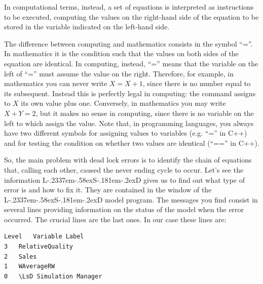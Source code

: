 \documentclass [11pt,a4paper] {book}
\def\LsD{{L\kern-.2337em\lower-.58ex\hbox{S}\kern-.181em\lower-.2ex\hbox{D}}\xspace}
\begin{document}
In computational terms, instead, a set of equations is interpreted as instructions to be executed, computing the values on the right-hand side of the equation to be stored in the variable indicated on the left-hand side.

The difference between computing and
mathematics consists in the symbol ``=''. In mathematics it is the condition such that
the values on both sides of the equation are identical. In computing, instead, ``=''
means that the variable on the left of ``='' must assume the value on the right.
Therefore, for example, in mathematics you can never write $X=X+1$, since there is no
number equal to its subsequent. Instead this is perfectly legal in computing: the
command assigns to $X$ its own value plus one. Conversely, in mathematics you may write
$X+Y=2$, but it makes no sense in computing, since there is no variable on the left to
which assign the value. Note that, in programming languages, you always have two
different symbols for assigning values to variables (e.g. ``='' in C++) and for testing
the condition on whether two values are identical (``=='' in C++).


So, the main problem with dead lock errors is to identify the chain of equations that,
calling each other, caused the never ending cycle to occur. Let's see the information \LsD
gives us to find out what type of error is and how to fix it. They are contained in the
 window of the \LsD model program. The messages you find consist in several
lines providing information on the status of the model when the error occurred. The
crucial lines are the last ones. In our case these lines are:

\begin{verbatim}
Level   Variable Label
3   RelativeQuality
2   Sales
1   WAverageRW
0   \LsD Simulation Manager

\end{verbatim}
\end{document}
